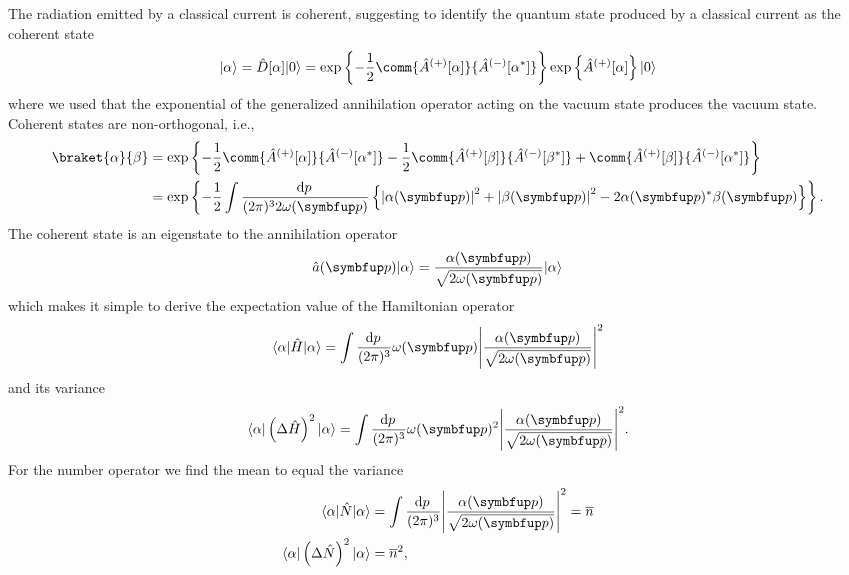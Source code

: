 The radiation emitted by a classical current is coherent, suggesting to identify the quantum state produced by a classical current as the coherent state
\begin{equation}
	\ket{\alpha}
	=
	\hat{D}[\alpha]
	\ket{0}
	=
	\exp\left\{
		-
		\frac{1}{2}
		\comm{\hat{A}^{(+)}[\alpha]}{\hat{A}^{(-)}[\alpha^*]}
	\right\}
	\exp\left\{
		\hat{A}^{(+)}[\alpha]
	\right\}
	\ket{0}
	\label{eq:coherent_state}
\end{equation}
where we used that the exponential of the generalized annihilation operator acting on the vacuum state produces the vacuum state.
Coherent states are non-orthogonal, i.e.,
\begin{equation}
	\begin{split}
		\braket{\alpha}{\beta}
		&=
		\exp\left\{
			-
			\frac{1}{2}
			\comm{\hat{A}^{(+)}[\alpha]}{\hat{A}^{(-)}[\alpha^*]}
			-
			\frac{1}{2}
			\comm{\hat{A}^{(+)}[\beta]}{\hat{A}^{(-)}[\beta^*]}
			+
			\comm{\hat{A}^{(+)}[\beta]}{\hat{A}^{(-)}[\alpha^*]}
		\right\}
		\\
		&=
		\exp\left\{
			-
			\frac{1}{2}
			\int\frac{\dd{p}}{(2\pi)^32\omega(\vb{p})}
			\left\{
				\abs*{\alpha(\vb{p})}^2
				+
				\abs*{\beta(\vb{p})}^2
				-
				2\alpha(\vb{p})^*\beta(\vb{p})
			\right\}
		\right\}
		\label{eq:coherent_state_inner}
		.
	\end{split}
\end{equation}
The coherent state is an eigenstate to the annihilation operator
\begin{equation}
	\hat{a}(\vb{p})
	\ket{\alpha}
	=
	\frac{\alpha(\vb{p})}{\sqrt{2\omega(\vb{p})}}
	\ket{\alpha}
	\label{eq:coherent_state_annihilation}
\end{equation}
which makes it simple to derive the expectation value of the Hamiltonian operator
\begin{equation}
	\bra{\alpha}
	\hat{H}
	\ket{\alpha}
	=
	\int\frac{\dd{p}}{(2\pi)^3}
	\omega(\vb{p})
	\abs*{\frac{\alpha(\vb{p})}{\sqrt{2\omega(\vb{p})}}}^2
	\label{eq:coherent_state_hamilton_expval}
\end{equation}
and its variance
\begin{equation}
	\bra{\alpha}
	\left(
		\Delta
		\hat{H}
	\right)^2
	\ket{\alpha}
	=
	\int\frac{\dd{p}}{(2\pi)^3}
	\omega(\vb{p})^2
	\abs*{\frac{\alpha(\vb{p})}{\sqrt{2\omega(\vb{p})}}}^2
	\label{eq:coherent_state_hamilton_variance}
	.
\end{equation}
For the number operator we find the mean to equal the variance
\begin{align}
	\bra{\alpha}
	\hat{N}
	\ket{\alpha}
	&=
	\int\frac{\dd{p}}{(2\pi)^3}
	\abs*{\frac{\alpha(\vb{p})}{\sqrt{2\omega(\vb{p})}}}^2
	=
	\overline{n}
	\label{eq:coherent_state_number_expval}
	\\
	\bra{\alpha}
	\left(
		\Delta
		\hat{N}
	\right)^2
	\ket{\alpha}
	&=
	\overline{n}^2
	\label{eq:coherent_state_number_variance}
	,
\end{align}
